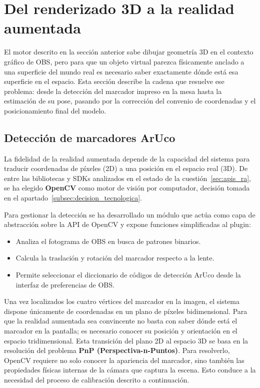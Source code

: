 \section{Del renderizado 3D a la realidad aumentada}
\label{sec:ra_3d}

El motor descrito en la sección anterior sabe dibujar geometría 3D en el contexto gráfico de OBS, pero para que un objeto virtual parezca físicamente anclado a una superficie del mundo real es necesario saber exactamente dónde está esa superficie en el espacio. Esta sección describe la cadena que resuelve ese problema: desde la detección del marcador impreso en la mesa hasta la estimación de su pose, pasando por la corrección del convenio de coordenadas y el posicionamiento final del modelo.

\subsection{Detección de marcadores ArUco}
\label{subsec:deteccion_aruco}

La fidelidad de la realidad aumentada depende de la capacidad del sistema para traducir coordenadas de píxeles (2D) a una posición en el espacio real (3D). De entre las bibliotecas y SDKs analizados en el estado de la cuestión~\ref{sec:apis_ra}, se ha elegido \textbf{OpenCV} como motor de visión por computador, decisión tomada en el apartado~\ref{subsec:decision_tecnologica}.

Para gestionar la detección se ha desarrollado un módulo que actúa como capa de abstracción sobre la API de OpenCV y expone funciones simplificadas al plugin:

\begin{itemize}
    \item Analiza el fotograma de OBS en busca de patrones binarios.
    \item Calcula la traslación y rotación del marcador respecto a la lente.
    \item Permite seleccionar el diccionario de códigos de detección ArUco desde la interfaz de preferencias de OBS.
\end{itemize}

Una vez localizados los cuatro vértices del marcador en la imagen, el sistema dispone únicamente de coordenadas en un plano de píxeles bidimensional. Para que la realidad aumentada sea convincente no basta con saber dónde está el marcador en la pantalla; es necesario conocer su posición y orientación en el espacio tridimensional. Esta transición del plano 2D al espacio 3D se basa en la resolución del problema \textbf{PnP (Perspectiva-n-Puntos)}. Para resolverlo, OpenCV requiere no solo conocer la apariencia del marcador, sino también las propiedades físicas internas de la cámara que captura la escena. Esto conduce a la necesidad del proceso de calibración descrito a continuación.

